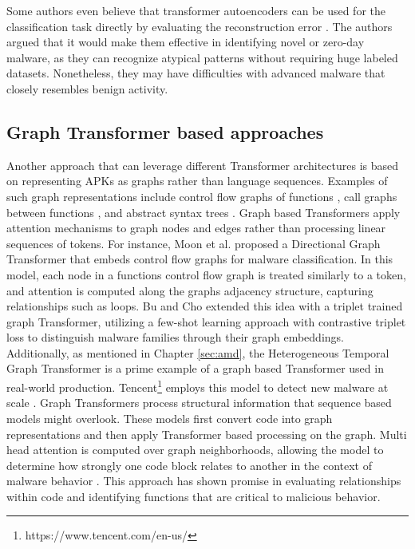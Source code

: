 Some authors even believe that transformer autoencoders can be used for the classification task directly
by evaluating the reconstruction error \cite{transformer_malware_overview}. 
The authors argued that it would make them effective in identifying novel or zero-day malware, 
as they can recognize atypical patterns without requiring huge labeled datasets. 
Nonetheless, they may have difficulties with advanced malware that closely resembles benign activity.

\subsection{Graph Transformer based approaches}

Another approach that can leverage different Transformer architectures is based on representing APKs 
as graphs rather than language sequences.
Examples of such graph representations include control flow graphs of functions \cite{scgformer}, 
call graphs between functions \cite{graphbert}, and abstract syntax trees \cite{tbased_codesum}.
Graph based Transformers apply attention mechanisms to graph nodes and edges rather than processing linear sequences of tokens.
For instance, Moon et al. \cite{controlflowbert} proposed a Directional Graph Transformer 
that embeds control flow graphs for malware classification.
In this model, each node in a functions control flow graph is treated similarly to a token, 
and attention is computed along the graphs adjacency structure, capturing relationships such as loops.
Bu and Cho \cite{trplet_graph_tran} extended this idea with a triplet trained graph Transformer, 
utilizing a few-shot learning approach with contrastive triplet 
loss to distinguish malware families through their graph embeddings.
Additionally, as mentioned in Chapter \ref{sec:amd}, 
the Heterogeneous Temporal Graph Transformer is a prime example of a graph based Transformer used in real-world production.
Tencent\footnote{https://www.tencent.com/en-us/} employs this model to detect new malware at scale \cite{htgt}.
Graph Transformers process structural information that sequence based models might overlook.
These models first convert code into graph representations and then apply Transformer based processing on the graph.
Multi head attention is computed over graph neighborhoods, 
allowing the model to determine how strongly one code block relates to another 
in the context of malware behavior \cite{transformer_malware_overview}.
This approach has shown promise in evaluating relationships within code and 
identifying functions that are critical to malicious behavior.

